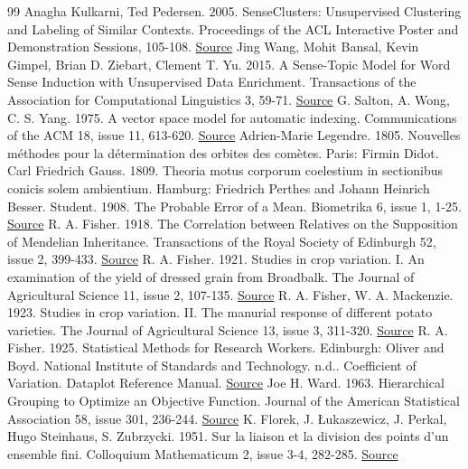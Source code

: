 \documentclass[10pt,letterpaper]{article}
\begin{document}
\begin{thebibliography}{99}
Anagha Kulkarni, Ted Pedersen. 2005. SenseClusters: Unsupervised Clustering and Labeling of Similar Contexts. Proceedings of the ACL Interactive Poster and Demonstration Sessions, 105-108. \href{https://aclanthology.org/P05-3027/}{Source}
Jing Wang, Mohit Bansal, Kevin Gimpel, Brian D. Ziebart, Clement T. Yu. 2015. A Sense-Topic Model for Word Sense Induction with Unsupervised Data Enrichment. Transactions of the Association for Computational Linguistics 3, 59-71. \href{https://aclanthology.org/Q15-1005/}{Source}
G. Salton, A. Wong, C. S. Yang. 1975. A vector space model for automatic indexing. Communications of the ACM 18, issue 11, 613-620. \href{https://doi.org/10.1145/361219.361220}{Source}
Adrien-Marie Legendre. 1805. Nouvelles méthodes pour la détermination des orbites des comètes. Paris: Firmin Didot.
Carl Friedrich Gauss. 1809. Theoria motus corporum coelestium in sectionibus conicis solem ambientium. Hamburg: Friedrich Perthes and Johann Heinrich Besser.
Student. 1908. The Probable Error of a Mean. Biometrika 6, issue 1, 1-25. \href{https://doi.org/10.1093/biomet/6.1.1}{Source}
R. A. Fisher. 1918. The Correlation between Relatives on the Supposition of Mendelian Inheritance. Transactions of the Royal Society of Edinburgh 52, issue 2, 399-433. \href{https://doi.org/10.1017/S0080456800012163}{Source}
R. A. Fisher. 1921. Studies in crop variation. I. An examination of the yield of dressed grain from Broadbalk. The Journal of Agricultural Science 11, issue 2, 107-135. \href{https://doi.org/10.1017/S0021859600003750}{Source}
R. A. Fisher, W. A. Mackenzie. 1923. Studies in crop variation. II. The manurial response of different potato varieties. The Journal of Agricultural Science 13, issue 3, 311-320. \href{https://doi.org/10.1017/S0021859600003592}{Source}
R. A. Fisher. 1925. Statistical Methods for Research Workers. Edinburgh: Oliver and Boyd.
National Institute of Standards and Technology. n.d.. Coefficient of Variation. Dataplot Reference Manual. \href{https://www.itl.nist.gov/div898/software/dataplot/refman2/auxillar/coefvari.htm}{Source}
Joe H. Ward. 1963. Hierarchical Grouping to Optimize an Objective Function. Journal of the American Statistical Association 58, issue 301, 236-244. \href{https://doi.org/10.1080/01621459.1963.10500845}{Source}
K. Florek, J. Łukaszewicz, J. Perkal, Hugo Steinhaus, S. Zubrzycki. 1951. Sur la liaison et la division des points d'un ensemble fini. Colloquium Mathematicum 2, issue 3-4, 282-285. \href{https://doi.org/10.4064/cm-2-3-4-282-285}{Source}

\end{thebibliography}
\end{document}

